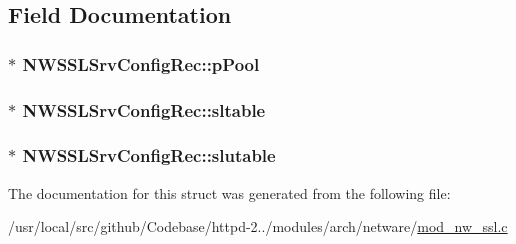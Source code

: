 \subsection{Field Documentation}
\subsubsection[{\texorpdfstring{p\+Pool}{pPool}}]{$\ast$ N\+W\+S\+S\+L\+Srv\+Config\+Rec\+::p\+Pool}\hypertarget{structNWSSLSrvConfigRec_a8ba851377a1fa1d5e253e436e5413464}{}\label{structNWSSLSrvConfigRec_a8ba851377a1fa1d5e253e436e5413464}
\subsubsection[{\texorpdfstring{sltable}{sltable}}]{$\ast$ N\+W\+S\+S\+L\+Srv\+Config\+Rec\+::sltable}\hypertarget{structNWSSLSrvConfigRec_a47d3d656189deed5fa9aaaa480ebe7bc}{}\label{structNWSSLSrvConfigRec_a47d3d656189deed5fa9aaaa480ebe7bc}
\subsubsection[{\texorpdfstring{slutable}{slutable}}]{$\ast$ N\+W\+S\+S\+L\+Srv\+Config\+Rec\+::slutable}\hypertarget{structNWSSLSrvConfigRec_a3eb8c680ec7d6064292768215a7dc05b}{}\label{structNWSSLSrvConfigRec_a3eb8c680ec7d6064292768215a7dc05b}


The documentation for this struct was generated from the following file\+:\begin{DoxyCompactItemize}
\item 
/usr/local/src/github/\+Codebase/httpd-\/2../modules/arch/netware/\hyperlink{mod__nw__ssl_8c}{mod\+\_\+nw\+\_\+ssl.\+c}\end{DoxyCompactItemize}
